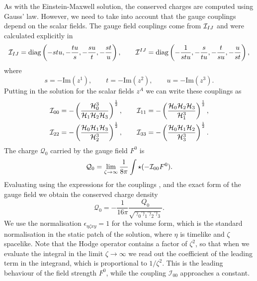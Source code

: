 As with the Einstein-Maxwell solution, the conserved charges are computed using Gauss' law. However, we need to take into account that the gauge couplings depend on the scalar fields. The gauge field couplings come from ${\cal I}_{IJ}$ and were calculated explicitly in 
\begin{equation*}
    {\cal I}_{IJ} = \text{diag} \left(-stu, -\frac{tu}{s}, -\frac{su}{t}, -\frac{st}{u} \right),
\qquad
    {\cal I}^{IJ} = \text{diag} \left(-\frac{1}{stu}, -\frac{s}{tu}, -\frac{t}{su}, -\frac{u}{st} \right),
\end{equation*}
where
\begin{equation*}
    s = -\text{Im}(z^1), \qquad t = -\text{Im}(z^2), \qquad u = -\text{Im}(z^3).
\end{equation*}
Putting in the solution  for the scalar fields $z^A$ we can write these couplings as
\begin{equation}
\label{eq:gaugecoup}
\begin{aligned}
        {\cal I}_{00} &= -\left(\frac{{\cal H}_0^3}{{\cal H}_1 {\cal H}_2 {\cal H}_3}\right)^{\frac{1}{2}}, \qquad {\cal I}_{11} = -\left(\frac{{\cal H}_0 {\cal H}_2 {\cal H}_3}{{\cal H}_1^3}\right)^{\frac{1}{2}}, \\
        {\cal I}_{22} &= -\left(\frac{{\cal H}_0 {\cal H}_1 {\cal H}_3}{{\cal H}_2^3}\right)^{\frac{1}{2}}, \qquad {\cal I}_{33} = -\left(\frac{{\cal H}_0 {\cal H}_1 {\cal H}_2}{{\cal H}_3^3}\right)^{\frac{1}{2}}.
\end{aligned}
\end{equation}
The charge $\mathcal{Q}_0$ carried by the gauge field $F^0$ is 
\begin{equation}
\label{eq:gaussSTU}
    \mathcal{Q}_0 = \lim_{\zeta \rightarrow \infty} \frac{1}{8 \pi} \int \star (-{\cal I}_{00} F^0) .
\end{equation}
Evaluating  using the expressions for the couplings , and the exact form of the gauge field  we obtain the conserved charge density
\begin{equation}
\label{eq:stuq}
    \mathcal{Q}_0 = -\frac{1}{16 \pi} \frac{Q_0}{\sqrt{\gamma_0 \gamma_1 \gamma_2 \gamma_3}} .
\end{equation}
We use the normalisation $\epsilon_{\eta \zeta x y} = 1$ for the 
volume form, which is the standard normalisation in the static patch of the solution, where $\eta$ is timelike and $\zeta$ spacelike. Note that the Hodge operator contains a factor of $\zeta^2$, so that when we evaluate the integral in the limit $\zeta\rightarrow \infty$ we read out the coefficient of the leading term in the integrand, which is proportional to $1/\zeta^2$. This is the leading behaviour of the field strength $F^0$, while the coupling $\mathcal{I}_{00}$ approaches a constant. 

